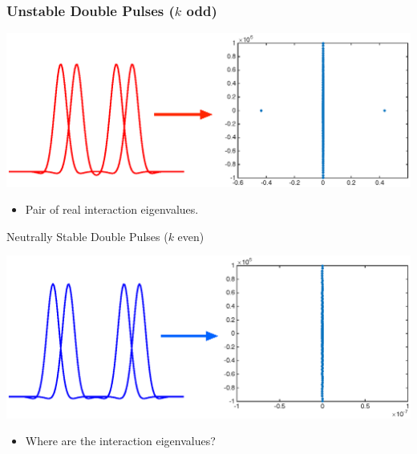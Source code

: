 \documentclass[16pt]{beamer}
\begin{document}
\begin{frame}
	\frametitle{Unstable Double Pulses ($k$ odd)}
	\fontsize{16}{7.2}\selectfont
	\begin{center}
		\includegraphics[width=1\linewidth]{images/doubleunstableeig}
	\end{center}
	\begin{itemize}
	\item Pair of real interaction eigenvalues.
	\end{itemize}
\end{frame}

\begin{frame}{Neutrally Stable Double Pulses ($k$ even)}
	\fontsize{16}{7.2}\selectfont
	\begin{center}
		\includegraphics[width=1\linewidth]{images/doublestableeig}
	\end{center}
	\begin{itemize}
	\item Where are the interaction eigenvalues?
	\end{itemize}
\end{frame}
\end{document}

